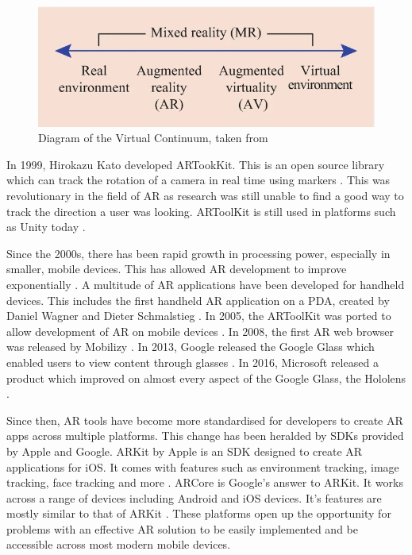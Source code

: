 \documentclass{l4proj}
\begin{document}
\begin{figure}[hbt!]
    \centering
    \includegraphics[width=0.5\linewidth]{dissertation//images/rvContinuum.jpg}
    \caption{Diagram of the Virtual Continuum, taken from \citep{vertucci_history_2023}}
    \label{fig:rvContinuum}
\end{figure}

In 1999, Hirokazu Kato developed ARTookKit. This is an open source library which can track the rotation of a camera in real time using markers \citep{kato1999marker}. This was revolutionary in the field of AR as research was still unable to find a good way to track the direction a user was looking. ARToolKit is still used in platforms such as Unity today \citep{vertucci_history_2023}.

Since the 2000s, there has been rapid growth in processing power, especially in smaller, mobile devices. This has allowed AR development to improve exponentially \citep{vertucci_history_2023}. A multitude of AR applications have been developed for handheld devices. This includes the first handheld AR application on a PDA, created by Daniel Wagner and Dieter Schmalstieg \citep{1241402}. In 2005, the ARToolKit was ported to allow development of AR on mobile devices \citep{10.1145/1179849.1179865}. In 2008, the first AR web browser was released by Mobilizy \citep{vertucci_history_2023}. In 2013, Google released the Google Glass which enabled users to view content through glasses \citep{vertucci_history_2023}. In 2016, Microsoft released a product which improved on almost every aspect of the Google Glass, the Hololens \citep{vertucci_history_2023}.

Since then, AR tools have become more standardised for developers to create AR apps across multiple platforms. This change has been heralded by SDKs provided by Apple and Google. ARKit by Apple is an SDK designed to create AR applications for iOS. 
It comes with features such as environment tracking, image tracking, face tracking and more \citep{9204243}. ARCore is Google's answer to ARKit. It works across a range of devices including Android and iOS devices. It's features are mostly similar to that of ARKit \citep{9204243}. These platforms open up the opportunity for problems with an effective AR solution to be easily implemented and be accessible across most modern mobile devices.
\end{document}
